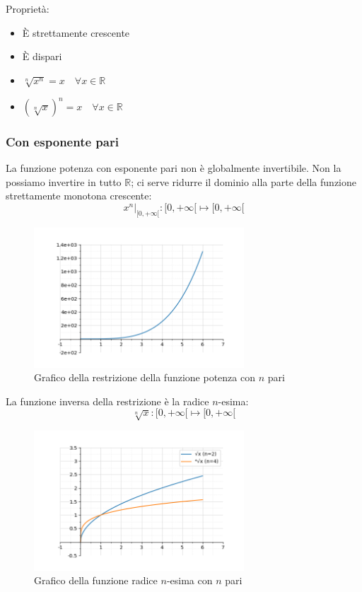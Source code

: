 \documentclass[oneside,10pt]{book} %
\begin{document}
Proprietà:
\begin{itemize}
\item È strettamente crescente
\item È dispari
\item $\sqrt[n]{x^n} = x \quad \forall x \in \mathbb{R}$
\item $(\sqrt[n]{x})^n = x \quad \forall x \in \mathbb{R}$
\end{itemize}

\subsubsection{Con esponente pari}
La funzione potenza con esponente pari non è globalmente invertibile. Non la possiamo invertire in tutto $\mathbb{R}$; ci serve ridurre il dominio alla parte della funzione strettamente monotona crescente:
$$x^n|_{[0, +\infty[}: [0,+\infty[ \mapsto [0, +\infty[ $$

\begin{figure}[H]
    \centering
    \includegraphics[width=0.7\textwidth]{./img/esponente_pari_ristretta.png}
    \caption{Grafico della restrizione della funzione potenza con $n$ pari}
    \label{fig:potenza_pari_ristretta}
\end{figure}
\FloatBarrier

La funzione inversa della restrizione è la radice $n$-esima:
$$\sqrt[n]{x}: [0, +\infty[ \mapsto [0, +\infty[ $$

\begin{figure}[H]
    \centering
    \includegraphics[width=0.7\textwidth]{./img/radice_pari.png}
    \caption{Grafico della funzione radice $n$-esima con $n$ pari}
    \label{fig:radice_pari}
\end{figure}
\FloatBarrier
\end{document}
